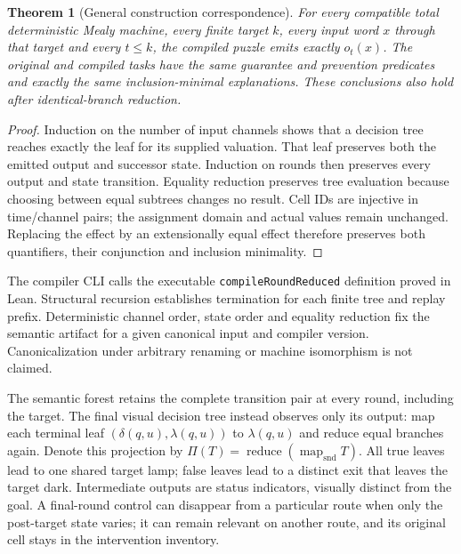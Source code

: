 \documentclass[11pt]{article}
\newtheorem{theorem}{Theorem}
\begin{document}
\begin{theorem}[General construction correspondence]\label{thm:compiler}
For every compatible total deterministic Mealy machine, every finite target
$k$, every input word $x$ through that target and every $t\leq k$, the compiled
puzzle emits exactly $o_t(x)$. The original and compiled tasks have the same
guarantee and prevention predicates and exactly the same inclusion-minimal
explanations. These conclusions also hold after identical-branch reduction.
\end{theorem}
\begin{proof}
Induction on the number of input channels shows that a decision tree reaches
exactly the leaf for its supplied valuation. That leaf preserves both the emitted
output and successor state. Induction on rounds then preserves every output and
state transition. Equality reduction preserves tree evaluation because choosing
between equal subtrees changes no result. Cell IDs are injective in time/channel
pairs; the assignment domain and actual values remain unchanged. Replacing the
effect by an extensionally equal effect therefore preserves both quantifiers,
their conjunction and inclusion minimality.
\end{proof}

The compiler CLI calls the executable \texttt{compileRoundReduced} definition
proved in Lean. Structural
recursion establishes termination for each finite tree and replay prefix.
Deterministic channel order, state order and equality reduction fix the semantic
artifact for a given canonical input and compiler version. Canonicalization
under arbitrary renaming or machine isomorphism is not claimed.

The semantic forest retains the complete transition pair at every round,
including the target. The final visual decision tree instead observes only its
output: map each terminal leaf $(\delta(q,u),\lambda(q,u))$ to
$\lambda(q,u)$ and reduce equal branches again. Denote this projection by
$\Pi(T)=\operatorname{reduce}(\operatorname{map}_{\mathrm{snd}}T)$.
All true leaves lead to one shared target lamp; false leaves lead to a distinct
exit that leaves the target dark. Intermediate outputs are status indicators,
visually distinct from the goal. A final-round control can disappear from a
particular route when only the post-target state varies; it can remain relevant
on another route, and its original cell stays in the intervention inventory.
\end{document}
